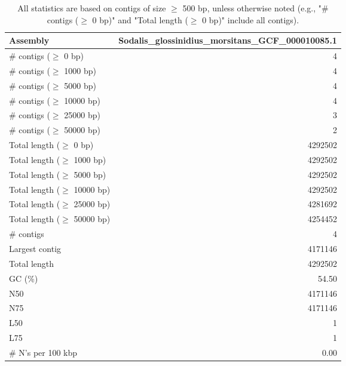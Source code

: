 \documentclass[12pt,a4paper]{article}
\begin{document}
\begin{table}[ht]
\begin{center}
\caption{All statistics are based on contigs of size $\geq$ 500 bp, unless otherwise noted (e.g., "\# contigs ($\geq$ 0 bp)" and "Total length ($\geq$ 0 bp)" include all contigs).}
\begin{tabular}{|l*{1}{|r}|}
\hline
Assembly & Sodalis\_glossinidius\_morsitans\_GCF\_000010085.1 \\ \hline
\# contigs ($\geq$ 0 bp) & 4 \\ \hline
\# contigs ($\geq$ 1000 bp) & 4 \\ \hline
\# contigs ($\geq$ 5000 bp) & 4 \\ \hline
\# contigs ($\geq$ 10000 bp) & 4 \\ \hline
\# contigs ($\geq$ 25000 bp) & 3 \\ \hline
\# contigs ($\geq$ 50000 bp) & 2 \\ \hline
Total length ($\geq$ 0 bp) & 4292502 \\ \hline
Total length ($\geq$ 1000 bp) & 4292502 \\ \hline
Total length ($\geq$ 5000 bp) & 4292502 \\ \hline
Total length ($\geq$ 10000 bp) & 4292502 \\ \hline
Total length ($\geq$ 25000 bp) & 4281692 \\ \hline
Total length ($\geq$ 50000 bp) & 4254452 \\ \hline
\# contigs & 4 \\ \hline
Largest contig & 4171146 \\ \hline
Total length & 4292502 \\ \hline
GC (\%) & 54.50 \\ \hline
N50 & 4171146 \\ \hline
N75 & 4171146 \\ \hline
L50 & 1 \\ \hline
L75 & 1 \\ \hline
\# N's per 100 kbp & 0.00 \\ \hline
\end{tabular}
\end{center}
\end{table}
\end{document}
